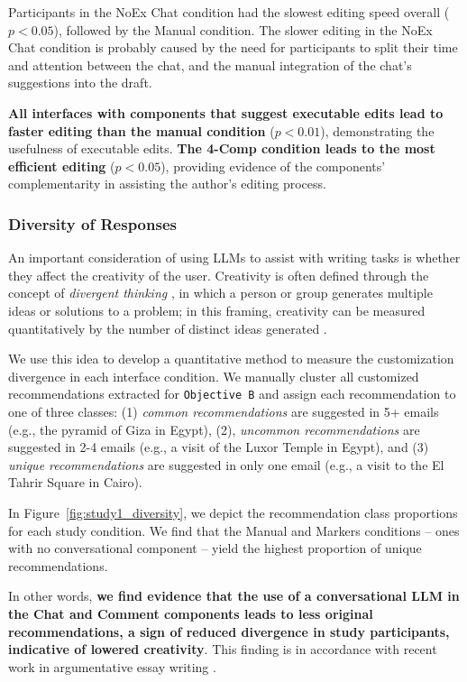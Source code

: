 \documentclass[manuscript]{acmart}
\begin{document}
Participants in the NoEx Chat condition had the slowest editing speed overall ($p<0.05$), followed by the Manual condition. The slower editing in the NoEx Chat condition is probably caused by the need for participants to split their time and attention between the chat, and the manual integration of the chat's suggestions into the draft.

\textbf{All interfaces with components that suggest executable edits lead to faster editing than the manual condition} ($p<0.01$), demonstrating the usefulness of executable edits.
\textbf{The 4-Comp condition leads to the most efficient editing} ($p<0.05$), providing evidence of the components' complementarity in assisting the author's editing process.

\subsubsection{Diversity of Responses} \label{sec:study1_evaluation_diversity}

An important consideration of using LLMs to assist with writing tasks is whether they affect the creativity of the user. Creativity is often defined through the concept of \textit{divergent thinking} \cite{guilford1967nature}, in which a person or group generates multiple ideas or solutions to a problem; in this framing, creativity can be measured quantitatively by the number of distinct ideas generated \cite{torrance1966torrance}.

We use this idea to develop a quantitative method to measure the customization divergence in each interface condition. We manually cluster all customized recommendations extracted for \texttt{Objective B} and assign each recommendation to one of three classes: (1) \textit{common recommendations} are suggested in 5+ emails (e.g., the pyramid of Giza in Egypt), (2), \textit{uncommon recommendations} are suggested in 2-4 emails (e.g., a visit of the Luxor Temple in Egypt), and (3) \textit{unique recommendations} are suggested in only one email (e.g., a visit to the El Tahrir Square in Cairo).

In Figure~\ref{fig:study1_diversity}, we depict the recommendation class proportions for each study condition. We find that the Manual and Markers conditions -- ones with no conversational component -- yield the highest proportion of unique recommendations.

In other words, \textbf{we find evidence that the use of a conversational LLM in the Chat and Comment components leads to less original recommendations, a sign of reduced divergence in study participants, indicative of lowered creativity}. This finding is in accordance with recent work in argumentative essay writing \cite{padmakumar2023does}.
\end{document}
